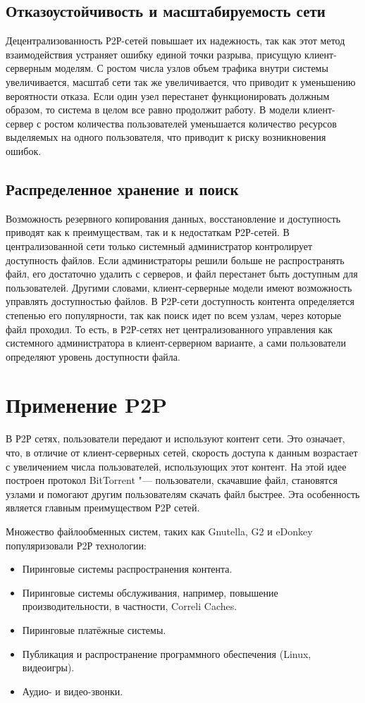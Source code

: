 \documentclass[bachelor, och, coursework]{SCWorks}
\begin{document}
\subsection{Отказоустойчивость и масштабируемость сети}
Децентрализованность Р2Р-сетей повышает их надежность, так как этот метод взаимодействия устраняет ошибку единой точки разрыва, присущую клиент-серверным моделям. С ростом числа узлов объем трафика внутри системы увеличивается, масштаб сети так же увеличивается, что приводит к уменьшению вероятности отказа. Если один узел перестанет функционировать должным образом, то система в целом все равно продолжит работу. 
В модели клиент-сервер с ростом количества пользователей уменьшается количество ресурсов выделяемых на одного пользователя, что приводит к риску возникновения ошибок.

\subsection{Распределенное хранение и поиск}
Возможность резервного копирования данных, восстановление и доступность приводят как к преимуществам, так и к недостаткам Р2Р-сетей. 
В централизованной сети только системный администратор контролирует доступность файлов. 
Если администраторы решили больше не распространять файл, его достаточно удалить с серверов,
и файл перестанет быть доступным для пользователей. Другими словами, клиент-серверные модели имеют возможность управлять доступностью файлов. В Р2Р-сети доступность контента определяется степенью его популярности, так как поиск идет по всем узлам, через которые файл проходил. 
То есть, в Р2Р-сетях нет централизованного управления как системного администратора в клиент-серверном варианте, 
а сами пользователи определяют уровень доступности файла.

\section{Применение P2P}
В Р2Р сетях, пользователи передают и используют контент сети. Это означает, что, в отличие от клиент-серверных сетей, 
скорость доступа к данным возрастает с увеличением числа пользователей, использующих этот контент. 
На этой идее построен протокол BitTorrent "--- пользователи, скачавшие файл, становятся узлами и помогают другим пользователям скачать файл быстрее. 
Эта особенность является главным преимуществом Р2Р сетей.

Множество файлообменных систем, таких как Gnutella, G2 и eDonkey популяризовали Р2Р технологии:
\begin{itemize}
    \item Пиринговые системы распространения контента.
    \item Пиринговые системы обслуживания, например, повышение производительности, в частности, Correli Caches.
    \item Пиринговые платёжные системы.
    \item Публикация и распространение программного обеспечения (Linux, видеоигры).
    \item Аудио- и видео-звонки.
\end{itemize}
\end{document}
